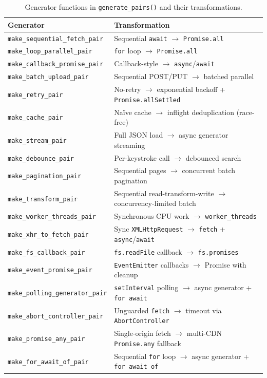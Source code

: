 \documentclass[runningheads]{llncs}
\begin{document}
\begin{table}[H]
  \centering
  \small
  \caption{Generator functions in \texttt{generate\_pairs()} and their transformations.}
  \label{tab:generators}
  \begin{tabular}{@{}lp{6cm}@{}}
    \toprule
    \textbf{Generator} & \textbf{Transformation} \\
    \midrule
    \texttt{make\_sequential\_fetch\_pair}    & Sequential \texttt{await} $\to$ \texttt{Promise.all} \\
    \texttt{make\_loop\_parallel\_pair}       & \texttt{for} loop $\to$ \texttt{Promise.all} \\
    \texttt{make\_callback\_promise\_pair}    & Callback-style $\to$ \texttt{async}/\texttt{await} \\
    \texttt{make\_batch\_upload\_pair}        & Sequential POST/PUT $\to$ batched parallel \\
    \texttt{make\_retry\_pair}               & No-retry $\to$ exponential backoff + \texttt{Promise.allSettled} \\
    \texttt{make\_cache\_pair}               & Na\"{i}ve cache $\to$ inflight deduplication (race-free) \\
    \texttt{make\_stream\_pair}              & Full JSON load $\to$ async generator streaming \\
    \texttt{make\_debounce\_pair}            & Per-keystroke call $\to$ debounced search \\
    \texttt{make\_pagination\_pair}          & Sequential pages $\to$ concurrent batch pagination \\
    \texttt{make\_transform\_pair}           & Sequential read-transform-write $\to$ concurrency-limited batch \\
    \texttt{make\_worker\_threads\_pair}     & Synchronous CPU work $\to$ \texttt{worker\_threads} \\
    \texttt{make\_xhr\_to\_fetch\_pair}      & Sync \texttt{XMLHttpRequest} $\to$ \texttt{fetch} + \texttt{async}/\texttt{await} \\
    \texttt{make\_fs\_callback\_pair}        & \texttt{fs.readFile} callback $\to$ \texttt{fs.promises} \\
    \texttt{make\_event\_promise\_pair}      & \texttt{EventEmitter} callbacks $\to$ Promise with cleanup \\
    \texttt{make\_polling\_generator\_pair}  & \texttt{setInterval} polling $\to$ async generator + \texttt{for await} \\
    \texttt{make\_abort\_controller\_pair}   & Unguarded \texttt{fetch} $\to$ timeout via \texttt{AbortController} \\
    \texttt{make\_promise\_any\_pair}        & Single-origin fetch $\to$ multi-CDN \texttt{Promise.any} fallback \\
    \texttt{make\_for\_await\_of\_pair}      & Sequential \texttt{for} loop $\to$ async generator + \texttt{for await of} \\
    \bottomrule
  \end{tabular}
\end{table}
\end{document}
